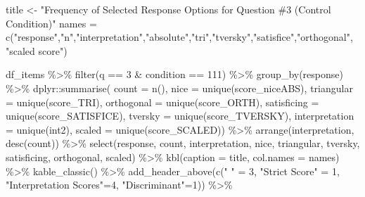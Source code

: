 \documentclass[
  letterpaper,
  DIV=11,
  numbers=noendperiod]{scrreprt}
\newenvironment{Shaded}{\begin{snugshade}}{\end{snugshade}}
\newcommand{\AttributeTok}[1]{\textcolor[rgb]{0.40,0.45,0.13}{#1}}
\newcommand{\DecValTok}[1]{\textcolor[rgb]{0.68,0.00,0.00}{#1}}
\newcommand{\FunctionTok}[1]{\textcolor[rgb]{0.28,0.35,0.67}{#1}}
\newcommand{\NormalTok}[1]{\textcolor[rgb]{0.00,0.23,0.31}{#1}}
\newcommand{\OtherTok}[1]{\textcolor[rgb]{0.00,0.23,0.31}{#1}}
\newcommand{\SpecialCharTok}[1]{\textcolor[rgb]{0.37,0.37,0.37}{#1}}
\newcommand{\StringTok}[1]{\textcolor[rgb]{0.13,0.47,0.30}{#1}}
\begin{document}
\begin{Shaded}
\begin{Highlighting}[]
\NormalTok{title }\OtherTok{\textless{}{-}} \StringTok{"Frequency of Selected Response Options for Question \#3 (Control Condition)"}
\NormalTok{names }\OtherTok{=} \FunctionTok{c}\NormalTok{(}\StringTok{"response"}\NormalTok{,}\StringTok{"n"}\NormalTok{,}\StringTok{"interpretation"}\NormalTok{,}\StringTok{"absolute"}\NormalTok{,}\StringTok{"tri"}\NormalTok{,}\StringTok{"tversky"}\NormalTok{,}\StringTok{"satisfice"}\NormalTok{,}\StringTok{"orthogonal"}\NormalTok{, }\StringTok{"scaled score"}\NormalTok{)}

\NormalTok{df\_items }\SpecialCharTok{\%\textgreater{}\%} \FunctionTok{filter}\NormalTok{(q }\SpecialCharTok{==} \DecValTok{3} \SpecialCharTok{\&}\NormalTok{ condition }\SpecialCharTok{==} \DecValTok{111}\NormalTok{) }\SpecialCharTok{\%\textgreater{}\%} \FunctionTok{group\_by}\NormalTok{(response) }\SpecialCharTok{\%\textgreater{}\%} 
\NormalTok{  dplyr}\SpecialCharTok{::}\FunctionTok{summarise}\NormalTok{( }\AttributeTok{count =} \FunctionTok{n}\NormalTok{(), }
                    \AttributeTok{nice =} \FunctionTok{unique}\NormalTok{(score\_niceABS),}
                    \AttributeTok{triangular =} \FunctionTok{unique}\NormalTok{(score\_TRI), }
                    \AttributeTok{orthogonal =}  \FunctionTok{unique}\NormalTok{(score\_ORTH),}
                    \AttributeTok{satisficing =}  \FunctionTok{unique}\NormalTok{(score\_SATISFICE),}
                    \AttributeTok{tversky =} \FunctionTok{unique}\NormalTok{(score\_TVERSKY),}
                    \AttributeTok{interpretation =} \FunctionTok{unique}\NormalTok{(int2),}
                    \AttributeTok{scaled =} \FunctionTok{unique}\NormalTok{(score\_SCALED)) }\SpecialCharTok{\%\textgreater{}\%} 
  \FunctionTok{arrange}\NormalTok{(interpretation, }\FunctionTok{desc}\NormalTok{(count)) }\SpecialCharTok{\%\textgreater{}\%} 
  \FunctionTok{select}\NormalTok{(response, count, interpretation, nice, }
\NormalTok{         triangular, tversky, satisficing, orthogonal, scaled) }\SpecialCharTok{\%\textgreater{}\%} 
  \FunctionTok{kbl}\NormalTok{(}\AttributeTok{caption =}\NormalTok{ title, }\AttributeTok{col.names =}\NormalTok{ names) }\SpecialCharTok{\%\textgreater{}\%}  \FunctionTok{kable\_classic}\NormalTok{() }\SpecialCharTok{\%\textgreater{}\%} 
  \FunctionTok{add\_header\_above}\NormalTok{(}\FunctionTok{c}\NormalTok{(}\StringTok{" "} \OtherTok{=} \DecValTok{3}\NormalTok{, }\StringTok{"Strict Score"} \OtherTok{=} \DecValTok{1}\NormalTok{, }\StringTok{"Interpretation Scores"}\OtherTok{=}\DecValTok{4}\NormalTok{, }\StringTok{"Discriminant"}\OtherTok{=}\DecValTok{1}\NormalTok{)) }\SpecialCharTok{\%\textgreater{}\%}

\end{Highlighting}
\end{Shaded}
\end{document}
